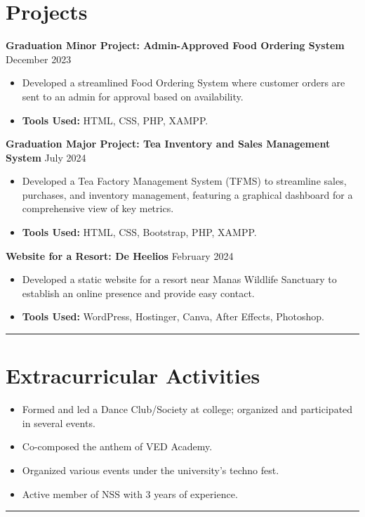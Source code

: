 \documentclass[a4paper,10pt]{article}
\begin{document}
\section*{\color{sectiongray} Projects}
\textbf{Graduation Minor Project: Admin-Approved Food Ordering System} \hfill December 2023 
\begin{itemize}[noitemsep]
     \item Developed a streamlined Food Ordering System where customer orders are sent to an admin for approval based on availability.
     \item \textbf{Tools Used:} HTML, CSS, PHP, XAMPP.
\end{itemize}
\textbf{Graduation Major Project: Tea Inventory and Sales Management System} \hfill July 2024 
\begin{itemize}[noitemsep]
     \item Developed a Tea Factory Management System (TFMS) to streamline sales, purchases, and inventory management, featuring a graphical dashboard for a comprehensive view of key metrics.
     \item \textbf{Tools Used:} HTML, CSS, Bootstrap, PHP, XAMPP.
\end{itemize}
\textbf{Website for a Resort: De Heelios} \hfill February 2024 
\begin{itemize}[noitemsep]
     \item Developed a static website for a resort near Manas Wildlife Sanctuary to establish an online presence and provide easy contact.
     \item \textbf{Tools Used:} WordPress, Hostinger, Canva, After Effects, Photoshop.
\end{itemize}

\noindent\rule{\textwidth}{0.5pt} 
\section*{\color{sectiongray} Extracurricular Activities}
\begin{itemize}[noitemsep]
    \item Formed and led a Dance Club/Society at college; organized and participated in several events.
    \item Co-composed the anthem of VED Academy.
    \item Organized various events under the university’s techno fest.
    \item Active member of NSS with 3 years of experience.
\end{itemize}

\noindent\rule{\textwidth}{0.5pt} 
\end{document}
